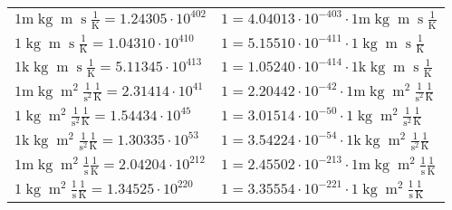 \begin{center}
\begin{longtable}{l l}
{\color{gray}$1 \bm{\mathrm{ m}}\operatorname{kg}{\operatorname{m}}{\operatorname{s}}{}\frac1{\operatorname{K}} = 1.24305\cdot10^{402} $}   & {\color{gray}$ 1 = 4.04013\cdot10^{-403} \cdot 1 \bm{\mathrm{ m}}\operatorname{kg}{\operatorname{m}}{\operatorname{s}}{}\frac1{\operatorname{K}}$}  \\
{\color{black}$1 \bm{\mathrm{ }}\operatorname{kg}{\operatorname{m}}{\operatorname{s}}{}\frac1{\operatorname{K}} = 1.04310\cdot10^{410} $}   & {\color{black}$ 1 = 5.15510\cdot10^{-411} \cdot 1 \bm{\mathrm{ }}\operatorname{kg}{\operatorname{m}}{\operatorname{s}}{}\frac1{\operatorname{K}}$}  \\
{\color{gray}$1 \bm{\mathrm{ k}}\operatorname{kg}{\operatorname{m}}{\operatorname{s}}{}\frac1{\operatorname{K}} = 5.11345\cdot10^{413} $}   & {\color{gray}$ 1 = 1.05240\cdot10^{-414} \cdot 1 \bm{\mathrm{ k}}\operatorname{kg}{\operatorname{m}}{\operatorname{s}}{}\frac1{\operatorname{K}}$}  \\
{\color{gray}$1 \bm{\mathrm{ m}}\operatorname{kg}{\operatorname{m}^2}\frac1{\operatorname{s}^2}{}\frac1{\operatorname{K}} = 2.31414\cdot10^{41} $}   & {\color{gray}$ 1 = 2.20442\cdot10^{-42} \cdot 1 \bm{\mathrm{ m}}\operatorname{kg}{\operatorname{m}^2}\frac1{\operatorname{s}^2}{}\frac1{\operatorname{K}}$}  \\
{\color{black}$1 \bm{\mathrm{ }}\operatorname{kg}{\operatorname{m}^2}\frac1{\operatorname{s}^2}{}\frac1{\operatorname{K}} = 1.54434\cdot10^{45} $}   & {\color{black}$ 1 = 3.01514\cdot10^{-50} \cdot 1 \bm{\mathrm{ }}\operatorname{kg}{\operatorname{m}^2}\frac1{\operatorname{s}^2}{}\frac1{\operatorname{K}}$}  \\
{\color{gray}$1 \bm{\mathrm{ k}}\operatorname{kg}{\operatorname{m}^2}\frac1{\operatorname{s}^2}{}\frac1{\operatorname{K}} = 1.30335\cdot10^{53} $}   & {\color{gray}$ 1 = 3.54224\cdot10^{-54} \cdot 1 \bm{\mathrm{ k}}\operatorname{kg}{\operatorname{m}^2}\frac1{\operatorname{s}^2}{}\frac1{\operatorname{K}}$}  \\
{\color{gray}$1 \bm{\mathrm{ m}}\operatorname{kg}{\operatorname{m}^2}\frac1{\operatorname{s}}{}\frac1{\operatorname{K}} = 2.04204\cdot10^{212} $}   & {\color{gray}$ 1 = 2.45502\cdot10^{-213} \cdot 1 \bm{\mathrm{ m}}\operatorname{kg}{\operatorname{m}^2}\frac1{\operatorname{s}}{}\frac1{\operatorname{K}}$}  \\
{\color{black}$1 \bm{\mathrm{ }}\operatorname{kg}{\operatorname{m}^2}\frac1{\operatorname{s}}{}\frac1{\operatorname{K}} = 1.34525\cdot10^{220} $}   & {\color{black}$ 1 = 3.35554\cdot10^{-221} \cdot 1 \bm{\mathrm{ }}\operatorname{kg}{\operatorname{m}^2}\frac1{\operatorname{s}}{}\frac1{\operatorname{K}}$}  \\

\end{longtable}
\end{center}
